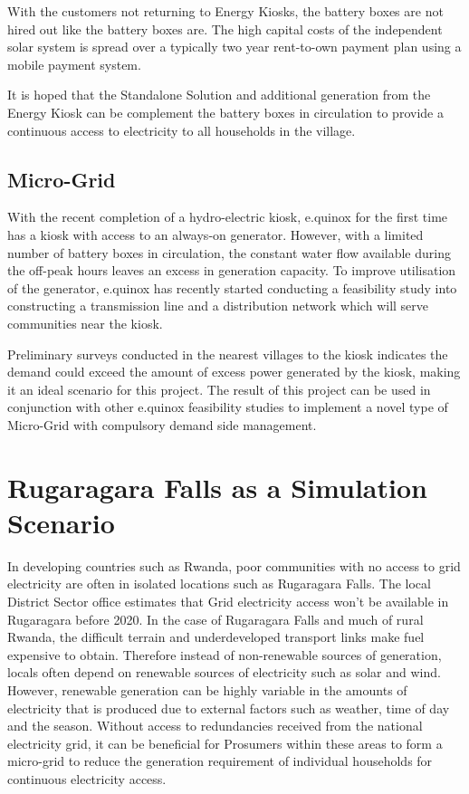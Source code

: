 With the customers not returning to Energy Kiosks, the battery boxes are not hired out like the battery boxes are. The high capital costs of the independent solar system is spread over a typically two year rent-to-own payment plan using a mobile payment system.

It is hoped that the Standalone Solution and additional generation from the Energy Kiosk can be complement the battery boxes in circulation to provide a continuous access to electricity to all households in the village.

\subsection*{Micro-Grid}
With the recent completion of a hydro-electric kiosk, e.quinox for the first time has a kiosk with access to an always-on generator. However, with a limited number of battery boxes in circulation, the constant water flow available during the off-peak hours leaves an excess in generation capacity. To improve utilisation of the generator, e.quinox has recently started conducting a feasibility study into constructing a transmission line and a distribution network which will serve communities near the kiosk.

Preliminary surveys conducted in the nearest villages to the kiosk indicates the demand could exceed the amount of excess power generated by the kiosk, making it an ideal scenario for this project. The result of this project can be used in conjunction with other e.quinox feasibility studies to implement a novel type of Micro-Grid with compulsory demand side management. 

\section*{Rugaragara Falls as a Simulation Scenario}
In developing countries such as Rwanda, poor communities with no access to grid electricity are often in isolated locations such as Rugaragara Falls. The local District Sector office estimates that Grid electricity access won't be available in Rugaragara before 2020. In the case of Rugaragara Falls and much of rural Rwanda, the difficult terrain and underdeveloped transport links make fuel expensive to obtain. Therefore instead of non-renewable sources of generation, locals often depend on renewable sources of electricity such as solar and wind. However, renewable generation can be highly variable in the amounts of electricity that is produced due to external factors such as weather, time of day and the season. Without access to redundancies received from the national electricity grid, it can be beneficial for Prosumers within these areas to form a micro-grid to reduce the generation requirement of individual households for continuous electricity access.

